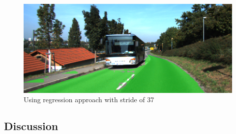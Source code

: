 \begin{figure}[]
	\centering
	\includegraphics[width=\columnwidth]{figures/models/testing2-um_32_conv_stride37.png}
	\caption{Using regression approach with stride of 37}
	\label{fig:reg_stride10}
\end{figure} 

\subsection{Discussion}